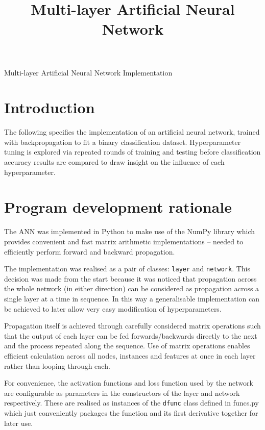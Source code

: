 \documentclass[12pt]{article}
\begin{document}
\title{Multi-layer Artificial Neural Network}

\begin{center}
  \Large{Multi-layer Artificial Neural Network Implementation}
\end{center}

\vspace{-3em}
\section{Introduction}

The following specifies the implementation of an artificial neural
network, trained with backpropagation to fit a binary classification
dataset. Hyperparameter tuning is explored via repeated rounds of
training and testing before classification accuracy results are compared
to draw insight on the influence of each hyperparameter.

\section{Program development rationale}

The ANN was implemented in Python to make use of the NumPy library which
provides convenient and fast matrix arithmetic implementations --
needed to efficiently perform forward and backward propagation.

The implementation was realised as a pair of classes: \texttt{layer}
and \texttt{network}. This decision was made from the start because
it was noticed that propagation across the whole network (in either
direction) can be considered as propagation across a single layer at a
time in sequence. In this way a generalisable implementation can be
achieved to later allow very easy modification of hyperparameters.

Propagation itself is achieved through carefully considered matrix
operations such that the output of each layer can be fed
forwards/backwards directly to the next and the process repeated along
the sequence. Use of matrix operations enables efficient calculation
across all nodes, instances and features at once in each layer rather
than looping through each.

For convenience, the activation functions and loss function used by the
network are configurable as parameters in the constructors of the layer
and network respectively. These are realised as instances of the
\texttt{dfunc} class defined in funcs.py which just conveniently
packages the function and its first derivative together for later use.
\end{document}
